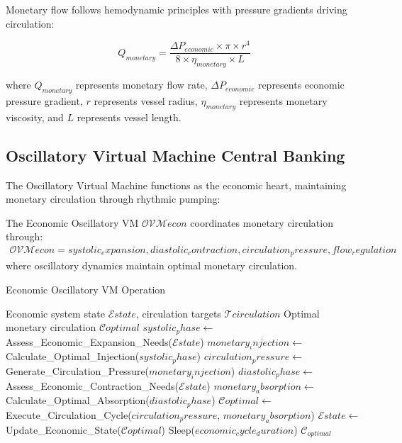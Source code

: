 Monetary flow follows hemodynamic principles with pressure gradients driving circulation:

\begin{equation}
Q_{monetary} = \frac{\Delta P_{economic} \times \pi \times r^4}{8 \times \eta_{monetary} \times L}
\end{equation}

where $Q_{monetary}$ represents monetary flow rate, $\Delta P_{economic}$ represents economic pressure gradient, $r$ represents vessel radius, $\eta_{monetary}$ represents monetary viscosity, and $L$ represents vessel length.

\subsection{Oscillatory Virtual Machine Central Banking}

The Oscillatory Virtual Machine functions as the economic heart, maintaining monetary circulation through rhythmic pumping:

\begin{definition}
The Economic Oscillatory VM $\mathcal{OVM}{econ}$ coordinates monetary circulation through:
\begin{align}
\mathcal{OVM}{econ} = {systolic_expansion, diastolic_contraction, circulation_pressure, flow_regulation}
\end{align}
where oscillatory dynamics maintain optimal monetary circulation.
\end{definition}

\begin{algorithm}
\caption{Economic Oscillatory VM Operation}
\begin{algorithmic}[1]
\REQUIRE Economic system state $\mathcal{E}{state}$, circulation targets $\mathcal{T}{circulation}$
\ENSURE Optimal monetary circulation $\mathcal{C}{optimal}$
\STATE $systolic_phase \leftarrow$ Assess_Economic_Expansion_Needs($\mathcal{E}{state}$)
\STATE $monetary_injection \leftarrow$ Calculate_Optimal_Injection($systolic_phase$)
\STATE $circulation_pressure \leftarrow$ Generate_Circulation_Pressure($monetary_injection$)
\STATE $diastolic_phase \leftarrow$ Assess_Economic_Contraction_Needs($\mathcal{E}{state}$)
\STATE $monetary_absorption \leftarrow$ Calculate_Optimal_Absorption($diastolic_phase$)
\STATE $\mathcal{C}{optimal} \leftarrow$ Execute_Circulation_Cycle($circulation_pressure$, $monetary_absorption$)
\STATE $\mathcal{E}{state} \leftarrow$ Update_Economic_State($\mathcal{C}{optimal}$)
\STATE Sleep($economic_cycle_duration$)
\ENDWHILE
\RETURN $\mathcal{C}_{optimal}$
\end{algorithmic}
\end{algorithm}


